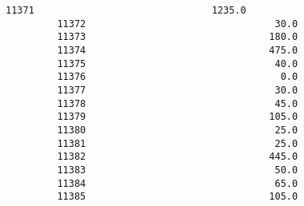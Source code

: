 \documentclass[11pt]{article}
\begin{document}
\begin{Verbatim}[commandchars=\\\{\}]
         11371                               1235.0   
         11372                                 30.0   
         11373                                180.0   
         11374                                475.0   
         11375                                 40.0   
         11376                                  0.0   
         11377                                 30.0   
         11378                                 45.0   
         11379                                105.0   
         11380                                 25.0   
         11381                                 25.0   
         11382                                445.0   
         11383                                 50.0   
         11384                                 65.0   
         11385                                105.0   
         

\end{Verbatim}
\end{document}
